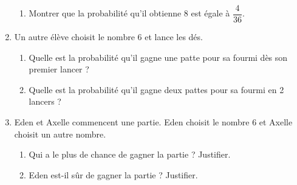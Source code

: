 \begin{activite}
\begin{QCM}
\begin{enumerate}
\begin{enumerate}
               \item Montrer que la probabilité qu’il obtienne 8 est égale à $\dfrac{4}{36}$.
            \end{enumerate}
         \item Un autre élève choisit le nombre 6 et lance les dés.
            \begin{enumerate}
               \item Quelle est la probabilité qu’il gagne une patte pour sa fourmi dès son premier lancer ?
               \item Quelle est la probabilité qu’il gagne deux pattes pour sa fourmi en 2 lancers ?
            \end{enumerate}
         \item Eden et Axelle commencent une partie. Eden choisit le nombre 6 et Axelle choisit un autre nombre.
            \begin{enumerate}
               \item Qui a le plus de chance de gagner la partie ? Justifier.
               \item Eden est-il sûr de gagner la partie ? Justifier. \medskip
            \end{enumerate}
      \end{enumerate}
   \end{QCM}
   
\pagebreak


\end{activite}
